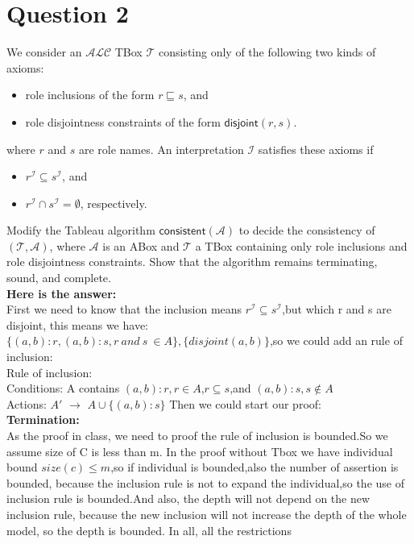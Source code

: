 \documentclass{article}
\begin{document}
    \section{Question 2}
    We consider an $\mathcal{ALC}$ TBox $\mathcal{T}$ consisting only of the following two kinds of axioms:
    \begin{itemize}
        \item  role inclusions of the form $r\sqsubseteq s$, and
        \item role disjointness constraints of the form $\textsf{disjoint}(r,s)$.
    \end{itemize}where $r$ and $s$ are role names. An interpretation $\mathcal{I}$ satisfies these axioms if
    \begin{itemize}
        \item  $r^{\mathcal{I}}\subseteq s^{\mathcal{I}}$, and
        \item $r^{\mathcal{I}}\cap s^{\mathcal{I}}=\emptyset$, respectively.
    \end{itemize}
    Modify the Tableau algorithm $\textsf{consistent}(\mathcal{A})$ to decide the consistency of $(\mathcal{T},\mathcal{A})$, where $\mathcal{A}$ is an ABox and $\mathcal{T}$ a TBox containing only role inclusions and role disjointness constraints. Show that the algorithm remains terminating, sound, and complete.\\
    \textbf{Here is the answer:}\\
    First we need to know that the inclusion means  $r^{\mathcal{I}}\subseteq s^{\mathcal{I}}$,but which r and s are disjoint, this means we have:
    $\{(a,b): r,(a,b): s,r\ and\ s\ \in A\},\{disjoint(a,b)\}$,so we could add an rule of inclusion:\\
    Rule of inclusion:\\ 
    Conditions: A contains $(a,b):r,r\in A$,$r \subseteq s$,and $(a,b):s,s \notin A$\\
    Actions:  $A'$ $\rightarrow$ $A \cup \{(a,b):s\}$
    Then we could start our proof:\\
    \textbf{Termination:}\\
    As the proof in class, we need to proof the rule of inclusion is bounded.So we assume size of C is less than m.
    In the proof without Tbox we have individual bound $size(c) \leq m$,so if individual is bounded,also the number of assertion is bounded,
    because the inclusion rule is not to expand the individual,so the use of inclusion rule is bounded.And also, the depth will not depend on the 
    new inclusion rule, because the new inclusion will not increase the depth of the whole model, so the depth is bounded. In all, all the restrictions 
\end{document}
